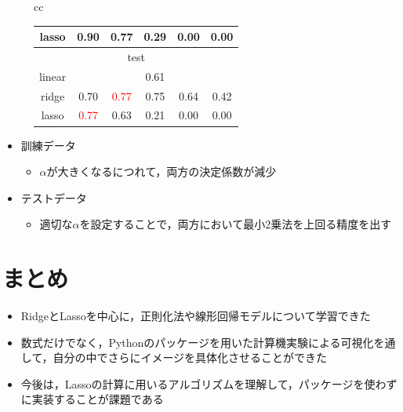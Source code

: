 \documentclass[dvipdfmx, 10pt]{beamer}
\begin{document}
\begin{frame}{\insertsubsection}
\begin{figure}[H]
\begin{tabular}{cc}
\begin{minipage}{0.6\hsize}
\begin{table}[H]
\begin{tabular}{|c|c|c|c|c|c|}
                        		lasso & 0.90 & 0.77 & 0.29 & 0.00 & 0.00\\
                        		\hline
                        		\hline
                        		\multicolumn{6}{|c|}{test} \\
                        		\hline
                        		linear & \multicolumn{5}{|c|}{0.61} \\
                        		\hline
                        		ridge & 0.70 & \textcolor{red}{0.77} & 0.75 & 0.64 & 0.42\\
                        		\hline
                        		lasso & \textcolor{red}{0.77} & 0.63 & 0.21 & 0.00 & 0.00 \\
                        		\hline
                                	\end{tabular}
                        	\label{tab:score}
                    \end{table}
             \end{minipage}
    	\end{tabular}
    \end{figure}
    \begin{itemize}
        \item 訓練データ
         \begin{itemize}
            \item $\alpha$が大きくなるにつれて，両方の決定係数が減少
        \end{itemize}
       \item テストデータ
         \begin{itemize}
            \item 適切な$\alpha$を設定することで，両方において最小2乗法を上回る精度を出す
        \end{itemize}
    \end{itemize}
\end{frame}

\section{まとめ}
\begin{frame}{\insertsection}
    
    \begin{itemize}
        \item RidgeとLassoを中心に，正則化法や線形回帰モデルについて学習できた
        \item 数式だけでなく，Pythonのパッケージを用いた計算機実験による可視化を通して，自分の中でさらにイメージを具体化させることができた
        \item 今後は，Lassoの計算に用いるアルゴリズムを理解して，パッケージを使わずに実装することが課題である
    \end{itemize}
\end{frame}
\end{document}

